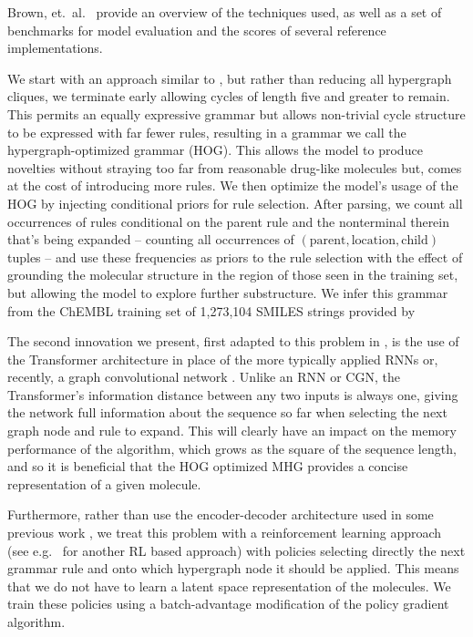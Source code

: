 \documentclass{article}
\begin{document}
Brown, et.~al.~\cite{brown2019} provide an overview of the techniques used, as well as a set of benchmarks for model evaluation and the scores of several reference implementations.

We start with an approach similar to  \cite{kajino2018}, but rather than reducing all hypergraph cliques, we terminate early allowing cycles of length five and greater to remain. This permits an equally expressive grammar but allows non-trivial cycle structure to be expressed with far fewer rules, resulting in a grammar we call the hypergraph-optimized grammar (HOG). This allows the model to produce novelties without straying too far from reasonable drug-like molecules but, comes at the cost of introducing more rules. We then optimize the model's usage of the HOG by injecting conditional priors for rule selection. After parsing, we count all occurrences of rules conditional on the parent rule and the nonterminal therein that's being expanded -- counting all occurrences of $(\text{parent}, \text{location}, \text{child})$ tuples -- and use these frequencies as priors to the rule selection with the effect of grounding the molecular structure in the region of those seen in the training set, but allowing the model to explore further substructure. We infer this grammar from the ChEMBL training set of 1,273,104 SMILES strings provided by \cite{pogany2019}

The second innovation we present, first adapted to this problem in \cite{kraev2018}, is the use of the Transformer architecture \cite{vaswani2017} in place of the more typically applied RNNs \cite{yang2017, olivecrona2017} or, recently, a graph convolutional network \cite{you2018}. Unlike an RNN or CGN, the Transformer's information distance between any two inputs is always one, giving the network full information about the sequence so far when selecting the next graph node and rule to expand. This will clearly have an impact on the memory performance of the algorithm, which grows as the square of the sequence length, and so it is beneficial that the HOG optimized MHG provides a concise representation of a given molecule.

Furthermore, rather than use the encoder-decoder architecture used in some previous work \cite{dai2018, jin2018, simonovsky2018, kusner2017, gomezbombarelli2016}, we treat this problem with a reinforcement learning approach (see e.g.~\cite{popova2018} for another RL based approach) with policies selecting directly the next grammar rule and onto which hypergraph node it should be applied. This means that we do not have to learn a latent space representation of the molecules. We train these policies using a batch-advantage modification of the policy gradient algorithm.
\end{document}
